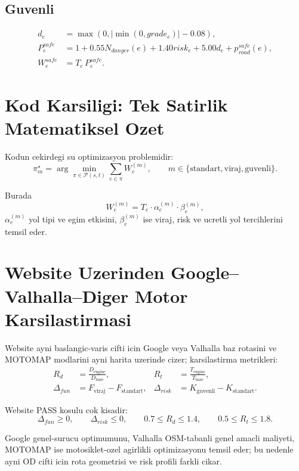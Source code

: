 ﻿\documentclass[11pt,a4paper]{article}
\begin{document}
\subsection{Guvenli}
\begin{align}
d_e &= \max(0,|\min(0,grade_e)|-0.08),\\
P^{safe}_e &= 1 + 0.55N_{danger}(e)+1.40risk_e+5.00d_e+p^{safe}_{road}(e),\\
W^{safe}_e &= T_e\,P^{safe}_e.
\end{align}

\section{Kod Karsiligi: Tek Satirlik Matematiksel Ozet}
\noindent Kodun cekirdegi su optimizasyon problemidir:
\begin{equation}
\pi_m^\star=\arg\min_{\pi \in \mathcal{P}(s,t)} \sum_{e \in \pi} W_e^{(m)},
\qquad
m \in \{\text{standart},\text{viraj},\text{guvenli}\}.
\end{equation}

\noindent Burada
\begin{equation}
W_e^{(m)} = T_e \cdot \alpha_e^{(m)} \cdot \beta_e^{(m)},
\end{equation}
\noindent $\alpha_e^{(m)}$ yol tipi ve egim etkisini, $\beta_e^{(m)}$ ise viraj, risk ve ucretli yol tercihlerini temsil eder.

\section{Website Uzerinden Google--Valhalla--Diger Motor Karsilastirmasi}
\noindent Website ayni baslangic-varis cifti icin Google veya Valhalla baz rotasini ve MOTOMAP modlarini ayni harita uzerinde cizer; karsilastirma metrikleri:
\begin{align}
R_d &= \frac{D_{\text{engine}}}{D_{\text{base}}}, &
R_t &= \frac{T_{\text{engine}}}{T_{\text{base}}},\\
\Delta_{fun} &= F_{\text{viraj}} - F_{\text{standart}}, &
\Delta_{risk} &= K_{\text{guvenli}} - K_{\text{standart}}.
\end{align}

\noindent Website PASS kosulu cok kisadir:
\begin{equation}
\Delta_{fun}\ge 0,\qquad \Delta_{risk}\le 0,\qquad
0.7 \le R_d \le 1.4,\qquad 0.5 \le R_t \le 1.8.
\end{equation}

\noindent Google genel-surucu optimumunu, Valhalla OSM-tabanli genel amacli maliyeti, MOTOMAP ise motosiklet-ozel agirlikli optimizasyonu temsil eder; bu nedenle ayni OD cifti icin rota geometrisi ve risk profili farkli cikar.
\end{document}
